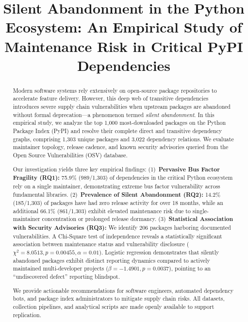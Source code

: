 \documentclass[conference]{IEEEtran}
\begin{document}
\title{Silent Abandonment in the Python Ecosystem: An Empirical Study of Maintenance Risk in Critical PyPI Dependencies}

\author{
}

\maketitle

\begin{abstract}
Modern software systems rely extensively on open-source package repositories to accelerate feature delivery. However, this deep web of transitive dependencies introduces severe supply chain vulnerabilities when upstream packages are abandoned without formal deprecation---a phenomenon termed \textit{silent abandonment}. In this empirical study, we analyze the top 1,000 most-downloaded packages on the Python Package Index (PyPI) and resolve their complete direct and transitive dependency graphs, comprising 1,303 unique packages and 3,022 dependency relations. We evaluate maintainer topology, release cadence, and known security advisories queried from the Open Source Vulnerabilities (OSV) database.

Our investigation yields three key empirical findings:
(1)~\textbf{Pervasive Bus Factor Fragility (RQ1):} 75.9\% (989/1,303) of dependencies in the critical Python ecosystem rely on a single maintainer, demonstrating extreme bus factor vulnerability across fundamental libraries.
(2)~\textbf{Prevalence of Silent Abandonment (RQ2):} 14.2\% (185/1,303) of packages have had zero release activity for over 18 months, while an additional 66.1\% (861/1,303) exhibit elevated maintenance risk due to single-maintainer concentration or prolonged release dormancy.
(3)~\textbf{Statistical Association with Security Advisories (RQ3):} We identify 206 packages harboring documented vulnerabilities. A Chi-Square test of independence reveals a statistically significant association between maintenance status and vulnerability disclosure ($\chi^2 = 8.0513, p = 0.00455, \alpha = 0.01$). Logistic regression demonstrates that silently abandoned packages exhibit distinct reporting dynamics compared to actively maintained multi-developer projects ($\beta = -1.4901, p = 0.0037$), pointing to an ``undiscovered defect'' reporting blindspot.

We provide actionable recommendations for software engineers, automated dependency bots, and package index administrators to mitigate supply chain risks. All datasets, collection pipelines, and analytical scripts are made openly available to support replication.
\end{abstract}
\end{document}
